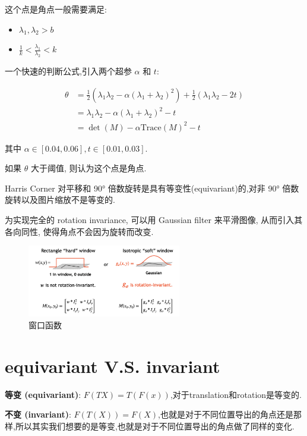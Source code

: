 \newpage
\begin{proposition}

这个点是角点一般需要满足:

\begin{itemize}
    \item $\lambda_1, \lambda_2>b$
    \item $\frac{1}{k}<\frac{\lambda_1}{\lambda_2}<k$
\end{itemize}

一个快速的判断公式,引入两个超参 $\alpha$ 和 $t$:

\begin{equation}
\begin{aligned}
\theta&=\frac 12(\lambda_1\lambda_2-\alpha(\lambda_1+\lambda_2)^2)+\frac12(\lambda_1\lambda_2-2t)\\
&=\lambda_1\lambda_2-\alpha(\lambda_1+\lambda_2)^2-t\\
&=\det(M)-\alpha\text{Trace}(M)^2-t
\end{aligned}
\end{equation}

其中 $\alpha\in[0.04,0.06], t\in[0.01,0.03]$.

如果 $\theta$ 大于阈值, 则认为这个点是角点.
\end{proposition}
\begin{note}
Harris Corner 对平移和 90° 倍数旋转是具有等变性(equivariant)的,对非 90° 倍数旋转以及图片缩放不是等变的.

为实现完全的 rotation invariance, 可以用 Gaussian filter 来平滑图像, 从而引入其各向同性, 使得角点不会因为旋转而改变.

\begin{figure}[htbp]
    \centering
    \includegraphics[width=0.6\textwidth]{figures/window-function.png}
    \caption{窗口函数}
\end{figure}


\end{note}
\section{equivariant V.S. invariant}
\begin{definition}
    

\textbf{等变 (equivariant)}: $F(TX)=T(F(x))$,对于translation和rotation是等变的.

\textbf{不变 (invariant)}: $F(T(X))=F(X)$,也就是对于不同位置导出的角点还是那样,所以其实我们想要的是等变,也就是对于不同位置导出的角点做了同样的变化.
\end{definition}

